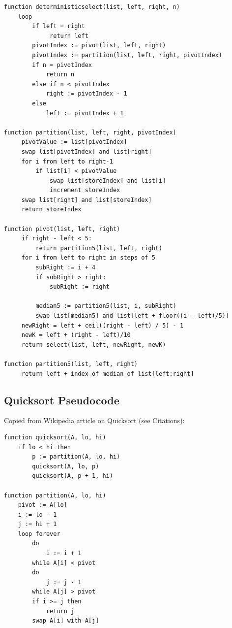 \documentclass{article}
\begin{document}
\begin{lstlisting}
function deterministicselect(list, left, right, n)
    loop
        if left = right
             return left
        pivotIndex := pivot(list, left, right)
        pivotIndex := partition(list, left, right, pivotIndex)
        if n = pivotIndex
            return n
        else if n < pivotIndex
            right := pivotIndex - 1
        else
            left := pivotIndex + 1
            
function partition(list, left, right, pivotIndex)
     pivotValue := list[pivotIndex]
     swap list[pivotIndex] and list[right]
     for i from left to right-1
         if list[i] < pivotValue
             swap list[storeIndex] and list[i]
             increment storeIndex
     swap list[right] and list[storeIndex]
     return storeIndex
     
function pivot(list, left, right)
     if right - left < 5:
         return partition5(list, left, right)
     for i from left to right in steps of 5
         subRight := i + 4
         if subRight > right:
             subRight := right

         median5 := partition5(list, i, subRight)
         swap list[median5] and list[left + floor((i - left)/5)]
     newRight = left + ceil((right - left) / 5) - 1
     newK = left + (right - left)/10
     return select(list, left, newRight, newK)
     
function partition5(list, left, right)
     return left + index of median of list[left:right]
\end{lstlisting}


\subsection*{Quicksort Pseudocode}
Copied from Wikipedia article on Quicksort (see Citations):

\begin{lstlisting}
function quicksort(A, lo, hi)
    if lo < hi then
        p := partition(A, lo, hi)
        quicksort(A, lo, p)
        quicksort(A, p + 1, hi)

function partition(A, lo, hi)
    pivot := A[lo]
    i := lo - 1
    j := hi + 1
    loop forever
        do
            i := i + 1
        while A[i] < pivot
        do
            j := j - 1
        while A[j] > pivot
        if i >= j then
            return j
        swap A[i] with A[j]
\end{lstlisting}
\end{document}
